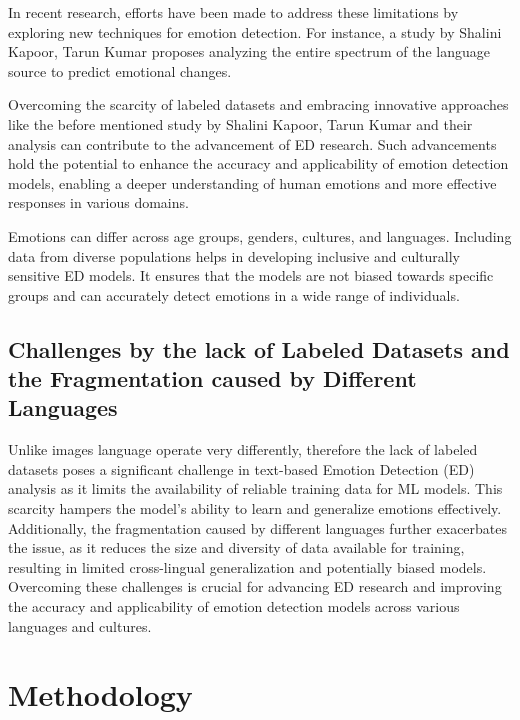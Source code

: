 \documentclass[11pt]{article}
\begin{document}
In recent research, efforts have been made to address these limitations by exploring new techniques for emotion detection. For instance, a study by Shalini Kapoor, Tarun Kumar \cite{KAPOOR2023120882} proposes analyzing the entire spectrum of the language source to predict emotional changes. 

Overcoming the scarcity of labeled datasets and embracing innovative approaches like the before mentioned study by Shalini Kapoor, Tarun Kumar \cite{KAPOOR2023120882} and their analysis can contribute to the advancement of ED research. Such advancements hold the potential to enhance the accuracy and applicability of emotion detection models, enabling a deeper understanding of human emotions and more effective responses in various domains.

Emotions can differ across age groups, genders, cultures, and languages. Including data from diverse populations helps in developing inclusive and culturally sensitive ED models. It ensures that the models are not biased towards specific groups and can accurately detect emotions in a wide range of individuals.

\subsection{Challenges by the lack of Labeled Datasets and the Fragmentation caused by Different Languages}
Unlike images language operate very differently, therefore the lack of labeled datasets poses a significant challenge in text-based Emotion Detection (ED) analysis as it limits the availability of reliable training data for ML models. This scarcity hampers the model's ability to learn and generalize emotions effectively. Additionally, the fragmentation caused by different languages further exacerbates the issue, as it reduces the size and diversity of data available for training, resulting in limited cross-lingual generalization and potentially biased models. Overcoming these challenges is crucial for advancing ED research and improving the accuracy and applicability of emotion detection models across various languages and cultures.

\section{Methodology}
\end{document}
